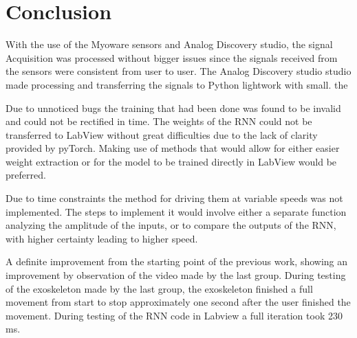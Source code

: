 \section{Conclusion}
With the use of the Myoware sensors and Analog Discovery studio, the signal Acquisition was processed without bigger issues since the signals received from the sensors were consistent from user to user. 
The Analog Discovery studio studio made processing and transferring the signals to Python lightwork with small. the 

Due to unnoticed bugs the training that had been done was found to be invalid and could not be rectified in time.
The
weights of the RNN could not be transferred to LabView without great difficulties due to the lack of clarity provided by
pyTorch. Making use of methods that would allow for either easier weight extraction or for the model to be trained
directly in LabView would be preferred.


Due to time constraints the method for driving them at variable speeds was not implemented. The steps to implement it
would involve either a separate function analyzing the amplitude of the inputs, or to compare the outputs of the RNN,
with higher certainty leading to higher speed.


A definite improvement from the starting point of the previous work, showing an improvement by observation of the video made by the last group. During testing of the exoskeleton made by the last group,
the exoskeleton finished a full movement from start to stop approximately one second after the user finished the movement. During testing of the RNN code in Labview a full iteration took 230 ms.


